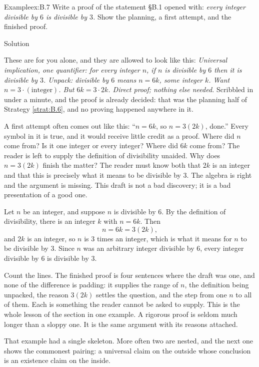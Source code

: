 \documentclass[a4paper,12pt,oneside]{memoir}
\begin{document}
\begin{workedexample}
\begin{envexample}{Example}{ex:B.7}{}
Write a proof of the statement §B.1 opened with: \emph{every integer divisible by \(6\) is divisible by \(3\).} Show the planning, a first attempt, and the finished proof.
\end{envexample}
\begin{envsolution}{Solution}{}{}
\begin{sollist}
  \item {} These are for you alone, and they are allowed to look like this: \emph{Universal implication, one quantifier: for every integer \(n\), if \(n\) is divisible by \(6\) then it is divisible by \(3\). Unpack: divisible by \(6\) means \(n = 6k\), some integer \(k\). Want \(n = 3 \cdot (\text{integer})\). But \(6k = 3 \cdot 2k\). Direct proof; nothing else needed.} Scribbled in under a minute, and the proof is already decided: that was the planning half of Strategy \ref{strat:B.6}, and no proving happened anywhere in it.
  \item {} A first attempt often comes out like this: “\(n = 6k\), so \(n = 3(2k)\), done.” Every symbol in it is true, and it would receive little credit as a proof. Where did \(n\) come from? Is it one integer or every integer? Where did \(6k\) come from? The reader is left to supply the definition of divisibility unaided. Why does \(n = 3(2k)\) finish the matter? The reader must know both that \(2k\) is an integer and that this is precisely what it means to be divisible by \(3\). The algebra is right and the argument is missing. This draft is not a bad discovery; it is a bad presentation of a good one.
  \item {} Let \(n\) be an integer, and suppose \(n\) is divisible by \(6\). By the definition of divisibility, there is an integer \(k\) with \(n = 6k\). Then \[ n = 6k = 3(2k), \] and \(2k\) is an integer, so \(n\) is \(3\) times an integer, which is what it means for \(n\) to be divisible by \(3\). Since \(n\) was an arbitrary integer divisible by \(6\), every integer divisible by \(6\) is divisible by \(3\).
\end{sollist}
Count the lines. The finished proof is four sentences where the draft was one, and none of the difference is padding: it supplies the range of \(n\), the definition being unpacked, the reason \(3(2k)\) settles the question, and the step from one \(n\) to all of them. Each is something the reader cannot be asked to supply. This is the whole lesson of the section in one example. A rigorous proof is seldom much longer than a sloppy one. It is the same argument with its reasons attached.
\end{envsolution}
\end{workedexample}
That example had a single skeleton. More often two are nested, and the next one shows the commonest pairing: a universal claim on the outside whose conclusion is an existence claim on the inside.
\end{document}
